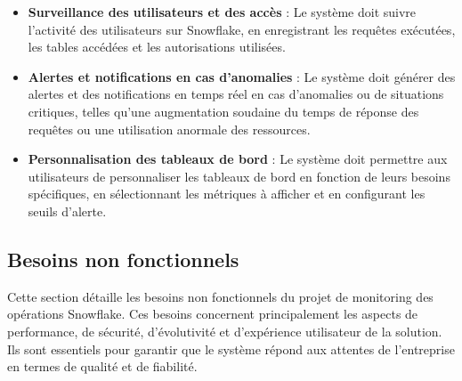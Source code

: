 \begin{itemize}
            \item \textbf{Surveillance des utilisateurs et des accès} :
            Le système doit suivre l'activité des utilisateurs sur Snowflake, en enregistrant les requêtes exécutées, les tables accédées et les autorisations utilisées.
            
            \item \textbf{Alertes et notifications en cas d'anomalies} :
            Le système doit générer des alertes et des notifications en temps réel en cas d'anomalies ou de situations critiques, telles qu'une augmentation soudaine du temps de réponse des requêtes ou une utilisation anormale des ressources.
            
            \item \textbf{Personnalisation des tableaux de bord} :
            Le système doit permettre aux utilisateurs de personnaliser les tableaux de bord en fonction de leurs besoins spécifiques, en sélectionnant les métriques à afficher et en configurant les seuils d'alerte.
        \end{itemize}        
    \subsection{Besoins non fonctionnels}
  \par Cette section détaille les besoins non fonctionnels du projet de monitoring des opérations Snowflake. 
  Ces besoins concernent principalement les aspects de performance, de sécurité, d'évolutivité et d'expérience utilisateur de la solution. Ils sont essentiels pour garantir que le système répond aux attentes de l'entreprise en termes de qualité et de fiabilité.

